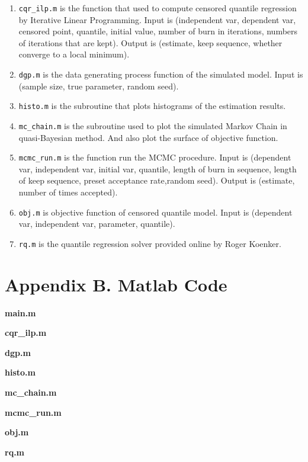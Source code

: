\documentclass[12pt]{article}
\theoremstyle{plain} \newtheorem{theorem}{Theorem}
\theoremstyle{definition} \newtheorem{definition}{Definition}
\renewcommand{\baselinestretch}{1.5}
\begin{document}
\begin{enumerate}
    \item \texttt{cqr\_ilp.m} is the function that used to compute censored quantile regression by Iterative Linear Programming. Input is (independent var, dependent var, censored point, quantile, initial value, number of burn in iterations, numbers of iterations that are kept). Output is (estimate, keep sequence, whether converge to a local minimum).
    \item \texttt{dgp.m} is the data generating process function of the simulated model. Input is (sample size, true parameter, random seed).
    \item \texttt{histo.m} is the subroutine that plots histograms of the estimation results.
    \item \texttt{mc\_chain.m} is the subroutine used to plot the simulated Markov Chain in quasi-Bayesian method. And also plot the surface of objective function.
    \item \texttt{mcmc\_run.m} is the function run the MCMC procedure. Input is (dependent var, independent var, initial var, quantile, length of burn in sequence, length of keep sequence, preset acceptance rate,random seed). Output is (estimate, number of times accepted).
    \item \texttt{obj.m} is objective function of censored quantile model. Input is (dependent var, independent var, parameter, quantile).
    \item \texttt{rq.m} is the quantile regression solver provided online by Roger Koenker.
\end{enumerate}

\clearpage
\renewcommand{\baselinestretch}{1}
\section*{Appendix B. Matlab Code}
\textbf{main.m}

\textbf{cqr\_ilp.m}

\textbf{dgp.m}

\textbf{histo.m}

\textbf{mc\_chain.m}

\textbf{mcmc\_run.m}

\textbf{obj.m}

\textbf{rq.m}

\end{document}
